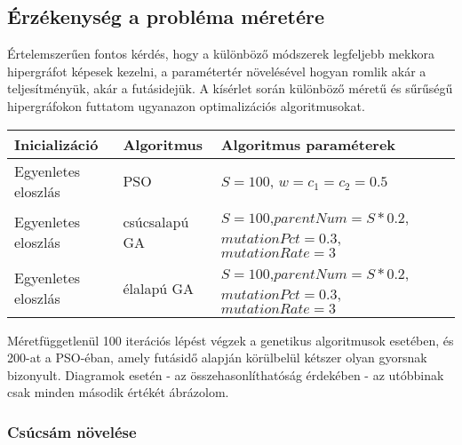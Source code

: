 \subsection{Érzékenység a probléma méretére}

Értelemszerűen fontos kérdés, hogy a különböző módszerek legfeljebb mekkora hipergráfot képesek kezelni, a paramétertér növelésével hogyan romlik akár a teljesítményük, akár a futásidejük. A kísérlet során különböző méretű és sűrűségű hipergráfokon futtatom ugyanazon optimalizációs algoritmusokat.

\begin{longtable}{| p{} | p{} | p{} |}
		\hline
		\hfil \textbf{Inicializáció} & \hfil \textbf{Algoritmus} & \hfil \textbf{Algoritmus paraméterek} \\
		\hline \hline
		\hfil Egyenletes eloszlás & \hfil PSO & $S=100$, $w=c_1=c_2=0.5$\\
		\hline
		\vfil \hfil Egyenletes eloszlás & \vfil \hfil csúcsalapú GA & $S=100$,\newline$parentNum=S*0.2$,\newline$mutationPct=0.3$,\newline$mutationRate=3$\\
		\hline
		\vfil \hfil Egyenletes eloszlás & \vfil \hfil élalapú GA & $S=100$,\newline$parentNum=S*0.2$,\newline$mutationPct=0.3$,\newline$mutationRate=3$ \\
		\hline
\end{longtable}

Méretfüggetlenül 100 iterációs lépést végzek a genetikus algoritmusok esetében, és 200-at a PSO-éban, amely futásidő alapján körülbelül kétszer olyan gyorsnak bizonyult. Diagramok esetén - az összehasonlíthatóság érdekében - az utóbbinak csak minden második értékét ábrázolom.

\subsubsection{Csúcsám növelése}

